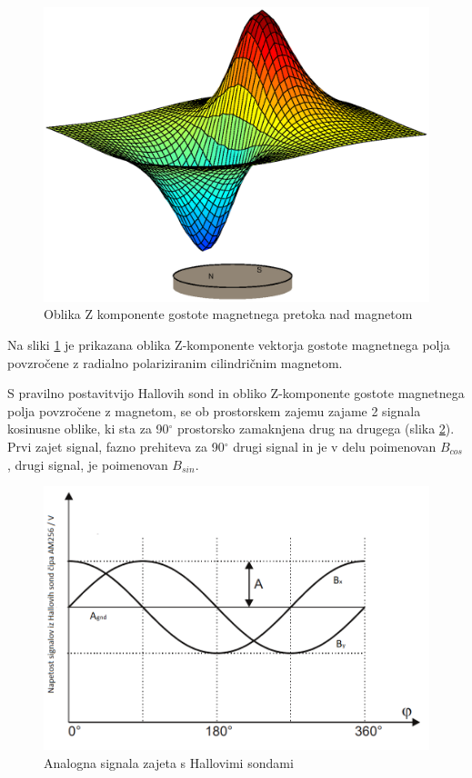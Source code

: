 \begin{figure}[ht]
	\centering
	\includegraphics[width=0.9\columnwidth]{./Slike/polje_brez_ravnine.eps}
	\caption{Oblika Z komponente gostote magnetnega pretoka nad magnetom}
	\label{polje_brez_ravnine}
\end{figure}

Na sliki \ref{polje_brez_ravnine}  je prikazana oblika Z-komponente vektorja gostote magnetnega polja povzročene z radialno polariziranim cilindričnim magnetom.

S pravilno postavitvijo Hallovih sond in obliko Z-komponente gostote magnetnega polja povzročene z magnetom, se ob prostorskem zajemu zajame 2 signala kosinusne oblike, ki sta za 90$^\circ$ prostorsko zamaknjena
drug na drugega (slika \ref{BxBy}). Prvi zajet signal,  fazno prehiteva za 90$^\circ$ drugi signal in je v delu poimenovan $B_{cos}$, drugi signal, je poimenovan $B_{sin}$.
\begin{figure}[ht]
	\centering
	\includegraphics[width=0.75\columnwidth]{./Slike/BxBy.png}
	\caption{Analogna signala zajeta s Hallovimi sondami \cite{AM8192}}
	\label{BxBy}
\end{figure}

